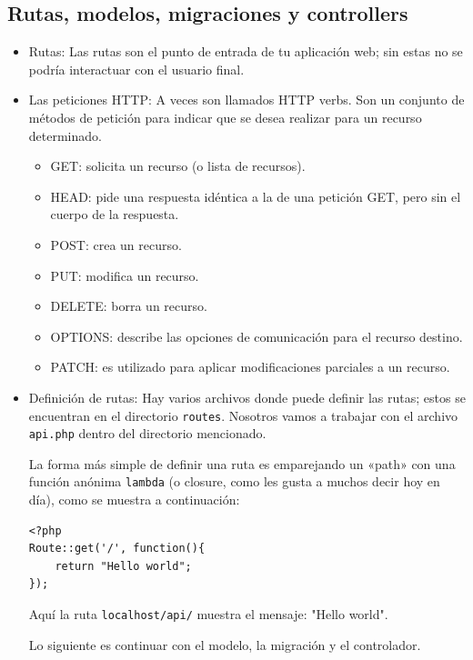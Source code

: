 \documentclass[11pt]{article}
\begin{document}
\subsection{Rutas, modelos, migraciones y controllers}
\label{sec:orge5738c7}
\begin{itemize}
\item Rutas:
\label{sec:org1d784e2}
Las rutas son el punto de entrada de tu aplicación web; sin estas no
se podría interactuar con el usuario final.

\item Las peticiones HTTP:
\label{sec:orgb828fbd}
A veces son llamados HTTP verbs. Son un conjunto de métodos de
petición para indicar que se desea realizar para un recurso
determinado.
\begin{itemize}
\item GET: solicita un recurso (o lista de recursos).
\item HEAD: pide una respuesta idéntica a la de una petición GET, pero
sin el cuerpo de la respuesta.
\item POST: crea un recurso.
\item PUT: modifica un recurso.
\item DELETE: borra un recurso.
\item OPTIONS: describe las opciones de comunicación para el recurso destino.
\item PATCH: es utilizado para aplicar modificaciones parciales a un recurso.
\end{itemize}

\item Definición de rutas:
\label{sec:org6681303}
Hay varios archivos donde puede definir las rutas; estos se encuentran
en el directorio \texttt{routes}. Nosotros vamos a trabajar con el archivo
\texttt{api.php} dentro del directorio mencionado.

La forma más simple de definir una ruta es emparejando un «path» con
una función anónima \texttt{lambda} (o closure, como les gusta a muchos decir
hoy en día), como se muestra a continuación:
\begin{verbatim}
<?php
Route::get('/', function(){
    return "Hello world";
});
\end{verbatim}

Aquí la ruta \texttt{localhost/api/} muestra el mensaje: "Hello world".

Lo siguiente es continuar con el modelo, la migración y el controlador.
\end{itemize}
\end{document}

